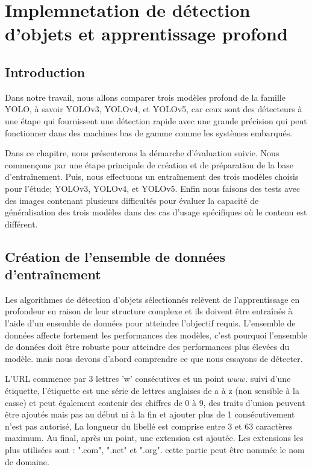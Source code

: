 %

\chapter{Implemnetation de détection d'objets et apprentissage profond}
\newpage
\pagestyle{fancy}
\fancyhead[L]{\chaptername \ \thechapter}
\renewcommand{\headrulewidth}{1pt}
\fancyfoot[C]{\thepage}

\section{Introduction} 
Dans notre travail, nous allons comparer trois modèles profond de la 
famille YOLO, à savoir YOLOv3, YOLOv4, et YOLOv5, car ceux sont des détecteurs à une étape qui fournissent une détection rapide avec une grande précision qui peut fonctionner dans des machines bas de gamme comme les systèmes embarqués.

Dans ce chapitre, nous présenterons la démarche d'évaluation suivie.
Nous commençons par une étape principale de création et de préparation de la base d'entraînement. Puis, nous effectuons un entraînement des trois modèles choisis pour l'étude; YOLOv3, YOLOv4, et YOLOv5. Enfin nous faisons des tests avec des images contenant plusieurs difficultés pour évaluer la capacité de généralisation des trois modèles dans des cas d'usage  spécifiques où le contenu est différent. 

\section{Création de l'ensemble de données d'entraînement}
Les algorithmes de détection d'objets sélectionnés relèvent de l'apprentissage en profondeur en raison de leur structure complexe et ils doivent être entraînés à l'aide d'un ensemble de données pour atteindre l'objectif requis. L'ensemble de données affecte fortement les performances des modèles, c'est pourquoi l'ensemble de données doit être robuste pour atteindre des performances plus élevées du modèle. mais nous devons d'abord comprendre ce que nous essayons de détecter.

          L'URL commence par 3 lettres 'w' consécutives et un point \(www.\) suivi d'une étiquette, l'étiquette est une série de lettres anglaises de a à z (non sensible à la casse) et peut également contenir des chiffres de 0 à 9, des traits d'union peuvent être ajoutés mais pas au début ni à la fin et ajouter plus de 1 consécutivement n'est pas autorisé, La longueur du libellé est comprise entre 3 et 63 caractères maximum. Au final, après un point, une extension est ajoutée. Les extensions les plus utilisées sont : ".com", ".net" et ".org". cette partie peut être nommée le nom de domaine.

